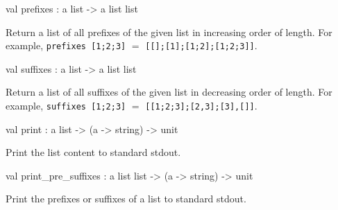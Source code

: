 \documentclass[11pt]{article}
\begin{document}
\label{val:Listplus.prefixes}\begin{ocamldoccode}
val prefixes : {\textquotesingle}a list -> {\textquotesingle}a list list
\end{ocamldoccode}
\begin{ocamldocdescription}
Return a list of all prefixes of the given list in increasing order of length. 
	For example, {\tt{prefixes [1;2;3]}} $=$ {\tt{[[];[1];[1;2];[1;2;3]]}}.


\end{ocamldocdescription}




\label{val:Listplus.suffixes}\begin{ocamldoccode}
val suffixes : {\textquotesingle}a list -> {\textquotesingle}a list list
\end{ocamldoccode}
\begin{ocamldocdescription}
Return a list of all suffixes of the given list in decreasing order of length. 
	For example, {\tt{suffixes [1;2;3]}} $=$ {\tt{[[1;2;3];[2,3];[3],[]]}}.


\end{ocamldocdescription}




\label{val:Listplus.print}\begin{ocamldoccode}
val print : {\textquotesingle}a list -> ({\textquotesingle}a -> string) -> unit
\end{ocamldoccode}
\begin{ocamldocdescription}
Print the list content to standard stdout.


\end{ocamldocdescription}




\label{val:Listplus.print-underscorepre-underscoresuffixes}\begin{ocamldoccode}
val print_pre_suffixes : {\textquotesingle}a list list -> ({\textquotesingle}a -> string) -> unit
\end{ocamldoccode}
\begin{ocamldocdescription}
Print the prefixes or suffixes of a list to standard stdout.


\end{ocamldocdescription}
\end{document}
